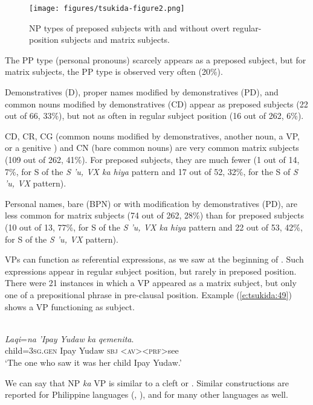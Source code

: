 \documentclass[output=paper
,modfonts
,nonflat]{langsci/langscibook}
\begin{document}
\begin{figure}
	\texttt{[image: figures/tsukida-figure2.png]}
	\caption{NP types of preposed subjects with and without overt regular-position subjects and matrix subjects.}
	\label{fig:tsukida:2}
\end{figure}

\noindent
The PP type (personal pronouns) scarcely appears as a preposed subject, but for matrix subjects, the PP type is observed very often (20\%). 

Demonstratives (D), proper names modified by demonstratives (PD), and common nouns modified by demonstratives (CD) appear as preposed subjects (22 out of 66, 33\%), but not as often in regular subject position (16 out of 262, 6\%). 

CD, CR, CG (common nouns modified by demonstratives, another noun, a VP, or a genitive ) and CN (bare common nouns) are very common matrix subjects (109 out of 262, 41\%). For preposed subjects, they are much fewer (1 out of 14, 7\%, for S of the \textit{S 'u, VX ka hiya} pattern and 17 out of 52, 32\%, for the S of \textit{S 'u, VX} pattern). 

Personal names, bare (BPN) or with modification by demonstratives (PD), are less common for matrix subjects (74 out of 262, 28\%) than for preposed subjects (10 out of 13, 77\%, for S of the \textit{S 'u, VX ka hiya} pattern and 22 out of 53, 42\%, for S of the \textit{S 'u, VX} pattern). 

VPs can function as referential expressions, as we saw at the beginning of . Such expressions appear in regular subject position, but rarely in preposed position. There were 21 instances in which a VP appeared as a matrix subject, but only one of a prepositional phrase in pre-clausal position. Example (\ref{e:tsukida:49}) shows a VP functioning as subject.

\begin{exe}
	\label{e:tsukida:49}\\
	\gll \textit{Laqi}=\textit{na} \textit{'Ipay}   \textit{Yudaw}  \textit{ka}   \textit{q}{\USSmaller}\textit{em}{\USGreater}{\USSmaller}\textit{en}{\USGreater}\textit{ita}.\\
	child=\textsc{3sg}.\textsc{gen} Ipay Yudaw \textsc{sbj} <\textsc{av}><\textsc{prf}>see\\
	\glt ‘The one who saw it was her child Ipay Yudaw.’
\end{exe}

\noindent
We can say that NP \textit{ka} VP is similar to a cleft or . Similar constructions are reported for Philippine languages (\citealt[140]{Himmelmann2005typo}, \citealt[604]{Nagaya2011}), and for many other  languages as well. 
\end{document}
